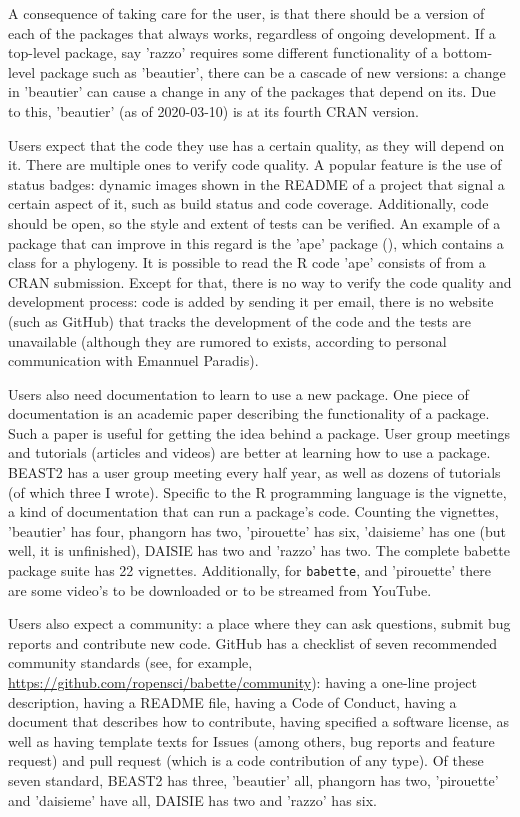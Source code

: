 A consequence of taking care for the user, is that there should be
a version of each of the packages that always works, regardless of ongoing
development. If a top-level package, say 'razzo' requires some different 
functionality of a bottom-level package such as 'beautier', there
can be a cascade of new versions: a change in 'beautier' 
can cause a change in any of the packages that depend on its.
Due to this, 'beautier' (as of 2020-03-10) is at its fourth CRAN version.

Users expect that the code they use has a certain quality,
as they will depend on it. There are multiple ones to verify
code quality. A popular feature is the use of status badges: 
dynamic images shown in the README of a project that 
signal a certain aspect of it, such as build status and code coverage.
Additionally, code should be open, so the style and extent of tests can
be verified. An example of a package that can improve in this
regard is the 'ape' package (\cite{ape}), which contains
a class for a phylogeny. It is possible to read the R code 'ape' consists
of from a CRAN submission. Except for that, there is no way to 
verify the code quality and development process: code is added by sending 
it per email, there is no website (such as
GitHub) that tracks the development of the code and the tests are 
unavailable (although they are rumored to exists, according to personal 
communication with Emannuel Paradis). 

Users also need documentation to learn to use a new package.
One piece of documentation is an academic paper describing the functionality
of a package. Such a paper is useful for getting the idea behind a package.
User group meetings and tutorials (articles and videos) are better at
learning how to use a package. BEAST2 has a user group meeting every half year,
as well as dozens of tutorials (of which three I wrote). Specific to
the R programming language is the vignette, a kind of documentation that
can run a package's code. Counting the vignettes, 'beautier' has four, 
phangorn has two, 'pirouette' has six, 'daisieme' has one (but well,
it is unfinished), DAISIE has two and 'razzo' has two. 
The complete babette package suite has
22 vignettes.
Additionally, for \verb;babette;, and 'pirouette' there are some video's to
be downloaded or to be streamed from YouTube.

Users also expect a community: a place where they can ask questions,
submit bug reports and contribute new code. GitHub has a checklist of
seven recommended community standards (see, for 
example, \url{https://github.com/ropensci/babette/community}): having 
a one-line project description, 
having a README file, having a Code of Conduct, having a
document that describes how to contribute, having specified a software license, 
as well as having template texts for Issues (among others, bug reports
and feature request) and pull request (which is a code contribution of any type).
Of these seven standard, BEAST2 has three, 
'beautier' all, phangorn has two, 'pirouette' and 'daisieme' have all,
DAISIE has two and 'razzo' has six.

